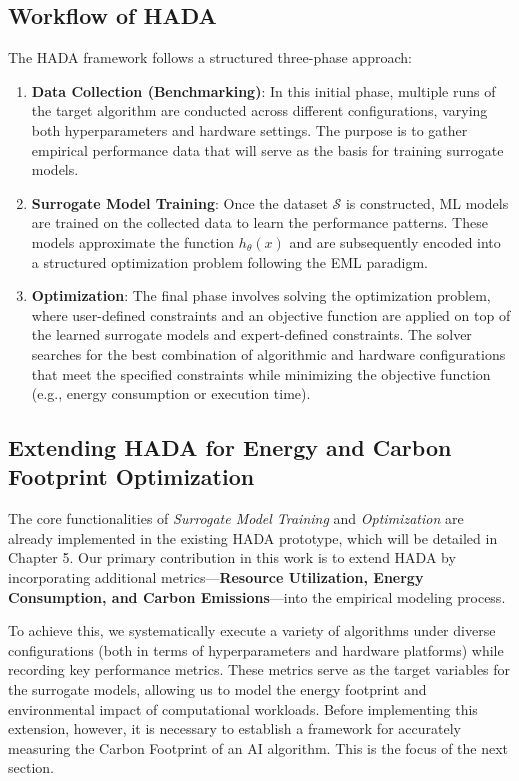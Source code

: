 \documentclass[a4paper,singleside,12pt]{report} %
\begin{document}
\subsection{Workflow of HADA}

The HADA framework follows a structured three-phase approach:

\begin{enumerate}
    \item \textbf{Data Collection (Benchmarking)}: In this initial phase, multiple runs of the target algorithm are conducted across 
    different configurations, varying both hyperparameters and hardware settings. The purpose is to gather empirical performance data 
    that will serve as the basis for training surrogate models.
    \item \textbf{Surrogate Model Training}: Once the dataset $\mathcal{S}$ is constructed, ML models are trained on the collected 
    data to learn the performance patterns. These models approximate the function $h_{\theta}(x)$ and are subsequently encoded into 
    a structured optimization problem following the EML paradigm.
    \item \textbf{Optimization}: The final phase involves solving the optimization problem, where user-defined constraints and an 
    objective function are applied on top of the learned surrogate models and expert-defined constraints. The solver searches for 
    the best combination of algorithmic and hardware configurations that meet the specified constraints while minimizing the 
    objective function (e.g., energy consumption or execution time).
\end{enumerate}

\subsection{Extending HADA for Energy and Carbon Footprint Optimization}

The core functionalities of \textit{Surrogate Model Training} and \textit{Optimization} are already implemented in the existing 
HADA prototype, which will be detailed in Chapter 5. Our primary contribution in this work is to extend HADA by incorporating 
additional metrics—\textbf{Resource Utilization, Energy Consumption, and Carbon Emissions}—into the empirical modeling process.

To achieve this, we systematically execute a variety of algorithms under diverse configurations (both in terms of hyperparameters 
and hardware platforms) while recording key performance metrics. These metrics serve as the target variables for the surrogate 
models, allowing us to model the energy footprint and environmental impact of computational workloads. Before implementing this 
extension, however, it is necessary to establish a framework for accurately measuring the Carbon Footprint of an AI algorithm. 
This is the focus of the next section.
\end{document}
